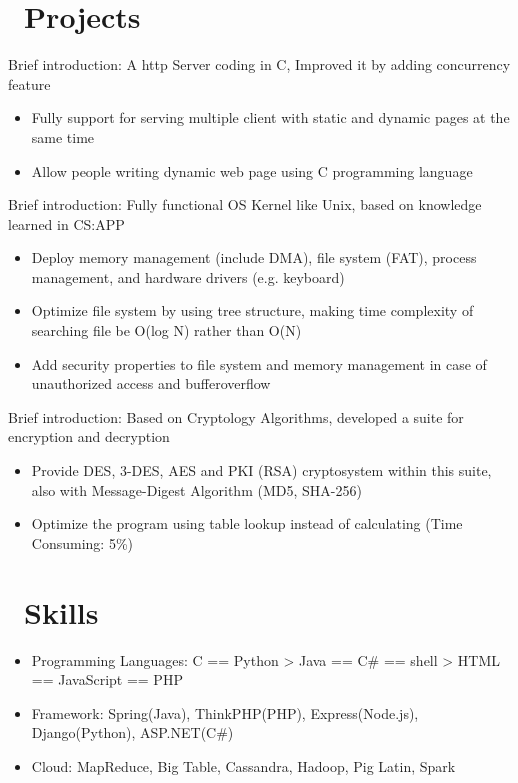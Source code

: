 \documentclass[8pt]{resume}
\begin{document}
\section{\faUsers\ Projects}
Brief introduction: A http Server coding in C, Improved it by adding concurrency feature
\begin{itemize}
  \item Fully support for serving multiple client with static and dynamic pages at the same time
  \item Allow people writing dynamic web page using C programming language
\end{itemize}

Brief introduction: Fully functional OS Kernel like Unix, based on knowledge learned in CS:APP
\begin{itemize}
  \item Deploy memory management (include DMA), file system (FAT), process management, and hardware drivers (e.g. keyboard)
  \item Optimize file system by using tree structure, making time complexity of searching file be O(log N) rather than O(N)
  \item Add security properties to file system and memory management in case of unauthorized access and bufferoverflow
\end{itemize}

Brief introduction: Based on Cryptology Algorithms, developed a suite for encryption and decryption
\begin{itemize}
  \item Provide DES, 3-DES, AES and PKI (RSA) cryptosystem within this suite, also with Message-Digest Algorithm (MD5, SHA-256)
  \item Optimize the program using table lookup instead of calculating (Time Consuming: 5\%) 
\end{itemize}

\section{\faCogs\ Skills}
\begin{itemize}[parsep=0.5ex]
  \item Programming Languages: C == Python > Java == C\# == shell > HTML == JavaScript ==  PHP
  \item Framework: Spring(Java), ThinkPHP(PHP), Express(Node.js), Django(Python), ASP.NET(C\#)
  \item Cloud: MapReduce, Big Table, Cassandra, Hadoop, Pig Latin, Spark
\end{itemize}
\end{document}

